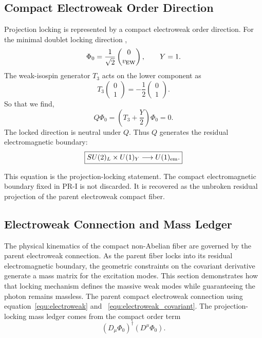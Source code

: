 \documentclass[11pt]{article}
\begin{document}
\subsection{Compact Electroweak Order Direction}
\label{sec:pr2_compact_electroweak_order_direction}

Projection locking is represented by a compact electroweak order direction. 
For the minimal doublet locking direction \cite{Higgs1964PRL},
\begin{equation}
\Phi_0
=
\frac{1}{\sqrt2}
\begin{pmatrix}
0\\
v_{\rm EW}
\end{pmatrix},
\qquad
Y=1.
\end{equation}
The weak-isospin generator \(T_3\) acts on the lower component as
\begin{equation}
T_3
\begin{pmatrix}
0\\
1
\end{pmatrix}
=
-\frac12
\begin{pmatrix}
0\\
1
\end{pmatrix}.
\end{equation}
So that we find,
\begin{equation}
\boxed{
Q\Phi_0
=
\left(
T_3+\frac{Y}{2}
\right)\Phi_0
=
0.
}
\end{equation}
The locked direction is neutral under \(Q\). 
Thus \(Q\) generates the residual electromagnetic boundary:
\begin{equation}
\boxed{
SU(2)_L\times U(1)_Y
\longrightarrow
U(1)_{\rm em}.
}
\end{equation}

This equation is the projection-locking statement. 
The compact electromagnetic boundary fixed in PR-I is not discarded. 
It is recovered as the unbroken residual projection of the parent electroweak compact fiber.

\subsection{Electroweak Connection and Mass Ledger}
\label{sec:pr2_electroweak_connection_mass_ledger}

The physical kinematics of the compact non-Abelian fiber are governed by the parent electroweak connection. As the parent fiber locks into its residual electromagnetic boundary, the geometric constraints on the covariant derivative generate a mass matrix for the excitation modes. This section demonstrates how that locking mechanism defines the massive weak modes while guaranteeing the photon remains massless. The parent compact electroweak connection using equation~\ref{equ:electroweak} and ~\ref{equ:electroweak_covariant}. The projection-locking mass ledger comes from the compact order term
\begin{equation}
\left(D_\mu\Phi_0\right)^\dagger
\left(D^\mu\Phi_0\right).
\end{equation}
\end{document}
